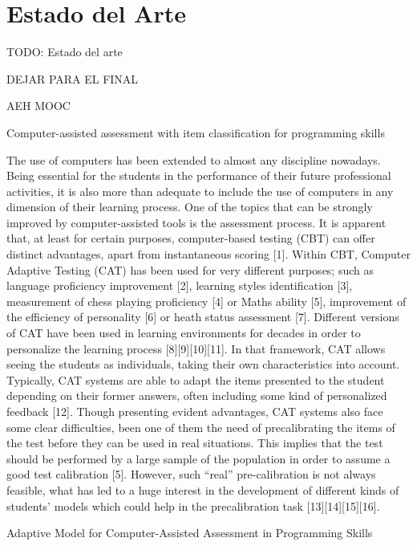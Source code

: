 \chapter{Estado del Arte\label{sec:estado_del_arte}}

TODO: Estado del arte

DEJAR PARA EL FINAL

AEH
MOOC




Computer-assisted assessment with item classification
for programming skills

The use of computers has been extended to almost any discipline
nowadays. Being essential for the students in the performance of
their future professional activities, it is also more than adequate to
include the use of computers in any dimension of their learning
process. One of the topics that can be strongly improved by
computer-assisted tools is the assessment process. It is apparent
that, at least for certain purposes, computer-based testing (CBT)
can offer distinct advantages, apart from instantaneous scoring
[1]. Within CBT, Computer Adaptive Testing (CAT) has been
used for very different purposes; such as language proficiency
improvement [2], learning styles identification [3], measurement
of chess playing proficiency [4] or Maths ability [5], improvement
of the efficiency of personality [6] or heath status assessment [7].
Different versions of CAT have been used in learning
environments for decades in order to personalize the learning
process [8][9][10][11]. In that framework, CAT allows seeing the
students as individuals, taking their own characteristics into
account. Typically, CAT systems are able to adapt the items
presented to the student depending on their former answers, often
including some kind of personalized feedback [12].
Though presenting evident advantages, CAT systems also face
some clear difficulties, been one of them the need of precalibrating
the items of the test before they can be used in real
situations. This implies that the test should be performed by a
large sample of the population in order to assume a good test
calibration [5]. However, such “real” pre-calibration is not always
feasible, what has led to a huge interest in the development of
different kinds of students’ models which could help in the precalibration
task [13][14][15][16].

Adaptive Model for Computer-Assisted Assessment in Programming Skills

